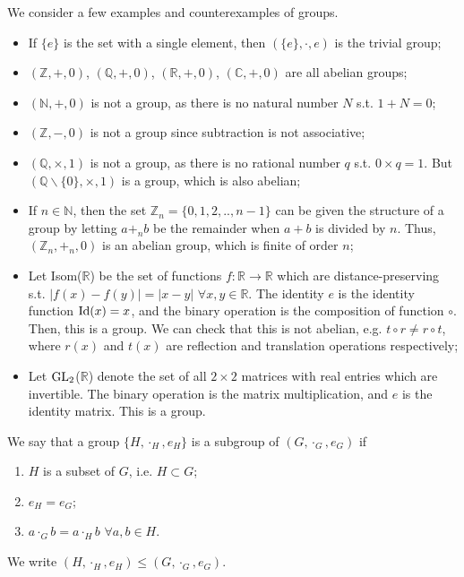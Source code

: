 \documentclass[a4paper]{article}
\begin{document}
\begin{eg}
We consider a few examples and counterexamples of groups.
\begin{itemize}
    \item If $\{e\}$ is the set with a single element, then $(\{e\},\cdot,e)$ is the trivial group;
    \item $(\mathbb{Z},+,0)$, $(\mathbb{Q},+,0)$, $(\mathbb{R},+,0)$, $(\mathbb{C},+,0)$ are all abelian groups;
    \item $(\mathbb{N},+,0)$ is not a group, as there is no natural number $N$ s.t. $1+N=0$;
    \item $(\mathbb{Z},-,0)$ is not a group since subtraction is not associative;
    \item $(\mathbb{Q},\times,1)$ is not a group, as there is no rational number $q$ s.t. $0\times q=1$. But $(\mathbb{Q}\backslash\{0\},\times,1)$ is a group, which is also abelian;
    \item If $n\in\mathbb{N}$, then the set $\mathbb{Z}_n=\{0,1,2,..,n-1\}$ can be given the structure of a group by letting $a+_nb$ be the remainder when $a+b$ is divided by $n$. Thus, $(\mathbb{Z}_n,+_n,0)$ is an abelian group, which is finite of order $n$;
    \item Let Isom($\mathbb{R}$) be the set of functions $f:\mathbb{R}\rightarrow\mathbb{R}$ which are distance-preserving s.t. $|f(x)-f(y)|=|x-y|$ $\forall x,y\in\mathbb{R}$. The identity $e$ is the identity function $\operatorname{Id}(x)=x$, and the binary operation is the composition of function $\circ$. Then, this is a group. We can check that this is not abelian, e.g. $t\circ r\neq r\circ t$, where $r(x)$ and $t(x)$ are reflection and translation operations respectively;
    \item Let $\operatorname{GL}_2$($\mathbb{R}$) denote the set of all $2\times 2$ matrices with real entries which are invertible. The binary operation is the matrix multiplication, and $e$ is the identity matrix. This is a group.
\end{itemize}
\end{eg}
\begin{defi}[Subgroup]
We say that a group $\{H,\cdot_H,e_H\}$ is a subgroup of $(G,\cdot_G,e_G)$ if
\begin{enumerate}
    \item $H$ is a subset of $G$, i.e. $H\subset G$;
    \item $e_H=e_G$;
    \item $a\cdot_Gb=a\cdot_Hb$ $\forall a,b\in H$.
\end{enumerate}
We write $(H,\cdot_H,e_H)\leq(G,\cdot_G,e_G)$.
\end{defi}
\end{document}
